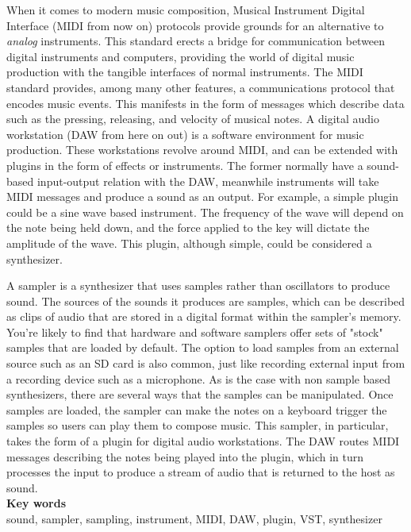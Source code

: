 \documentclass[12pt , a4paper]{article}
\begin{document}
	\normalsize
	When it comes to modern music composition, Musical Instrument Digital Interface (MIDI from now on) protocols provide grounds for an alternative to \textit{analog} instruments. This standard erects a bridge for communication between digital instruments and computers, providing the world of digital music production with the tangible interfaces of normal instruments. The MIDI standard provides, among many other features, a communications protocol that encodes music events. This manifests in the form of messages which describe data such as the pressing, releasing, and velocity of musical notes. A digital audio workstation (DAW from here on out) is a software environment for music production. These workstations revolve around MIDI, and can be extended with plugins in the form of effects or instruments. The former normally have a sound-based input-output relation with the DAW, meanwhile instruments will take MIDI messages and produce a sound as an output. For example, a simple plugin could be a sine wave based instrument. The frequency of the wave will depend on the note being held down, and the force applied to the key will dictate the amplitude of the wave. This plugin, although simple, could be considered a synthesizer.
		
	\par
	A sampler is a synthesizer that uses samples rather than oscillators to produce sound.  The sources of the sounds it produces are samples, which can be described as clips of audio that are stored in a digital format within the sampler's memory. You're likely to find that hardware and software samplers offer sets of "stock" samples that are loaded by default. The option to load samples from an external source such as an SD card is also common, just like recording external input from a recording device such as a microphone. As is the case with non sample based synthesizers, there are several ways that the samples can be manipulated. Once samples are loaded, the sampler can make the notes on a keyboard trigger the samples so users can play them to compose music. This sampler, in particular, takes the form of a plugin for digital audio workstations. The DAW routes MIDI messages describing the notes being played into the plugin, which in turn processes the input to produce a stream of audio that is returned to the host as sound.\\
	

	\large
	\textbf{Key words}\\
	
	\vspace{-1em}
	\normalsize	
	\noindent sound, sampler, sampling, instrument, MIDI, DAW, plugin, VST, synthesizer\\
\end{document}
